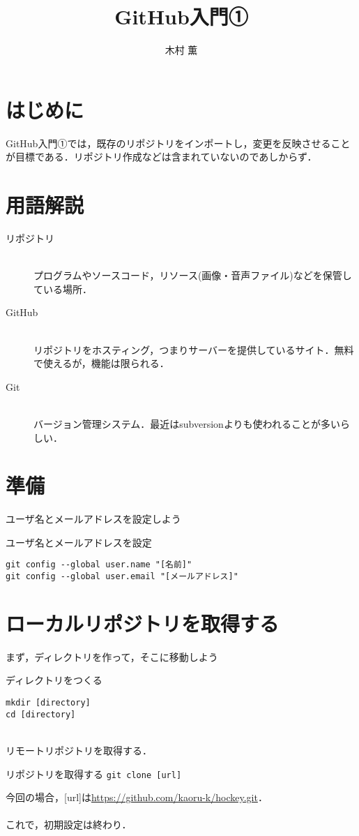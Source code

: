 \documentclass{jarticle}
\title{GitHub入門①}
\author{木村 薫}
\begin{document}
\maketitle
\section{はじめに}
GitHub入門①では，既存のリポジトリをインポートし，変更を反映させることが目標である．リポジトリ作成などは含まれていないのであしからず．
%
\section{用語解説}
\begin{description}
\item[リポジトリ]\mbox{}\\
  プログラムやソースコード，リソース(画像・音声ファイル)などを保管している場所．
\item[GitHub]\mbox{}\\
  リポジトリをホスティング，つまりサーバーを提供しているサイト．無料で使えるが，機能は限られる．
\item[Git]\mbox{}\\
  バージョン管理システム．最近はsubversionよりも使われることが多いらしい．
\end{description}
%
\section{準備}
ユーザ名とメールアドレスを設定しよう\\
\begin{itembox}[l]{ユーザ名とメールアドレスを設定}
\begin{verbatim}
git config --global user.name "[名前]"
git config --global user.email "[メールアドレス]"
\end{verbatim}
\end{itembox}
\section{ローカルリポジトリを取得する}
まず，ディレクトリを作って，そこに移動しよう\\
\begin{itembox}[l]{ディレクトリをつくる}
\begin{verbatim}
mkdir [directory]
cd [directory]
\end{verbatim}
\end{itembox}
\\
リモートリポジトリを取得する．\\
\begin{itembox}[l]{リポジトリを取得する}
{\tt git clone [url]}
\end{itembox}
今回の場合，[url]は\url{https://github.com/kaoru-k/hockey.git}．\\
\\
これで，初期設定は終わり．
%
\end{document}
